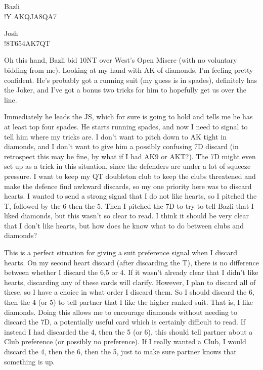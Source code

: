 \documentclass[a4paper]{report}
\theoremstyle{question}
\theoremstyle{theorem}
\theoremstyle{definition}
\newcommand{\<}{\left\langle}%
\renewcommand{\>}{\right\rangle}%
\begin{document}
\begin{center}
Bazli\\
\hand*!{Y AKQJ}{A8}{Q}{A7}
    
Josh\\
\hand*!{8}{T654}{AK7}{QT}
\end{center}

Oh this hand, Bazli bid 10NT over West's Open Misere (with no voluntary bidding from me). Looking at my hand with AK of diamonds, I'm feeling pretty confident. He's probably got a running suit (my guess is in spades), definitely has the Joker, and I've got a bonus two tricks for him to hopefully get us over the line.

Immediately he leads the JS, which for sure is going to hold and tells me he has at least top four spades. He starts running spades, and now I need to signal to tell him where my tricks are. I don't want to pitch down to AK tight in diamonds, and I don't want to give him a possibly confusing 7D discard (in retrospect this may be fine, by what if I had AK9 or AKT?). The 7D might even set up as a trick in this situation, since the defenders are under a lot of squeeze pressure. I want to keep my QT doubleton club to keep the clubs threatened and make the defence find awkward discards, so my one priority here was to discard hearts. I wanted to send a strong signal that I do not like hearts, so I pitched the T, followed by the 6 then the 5. Then I pitched the 7D to try to tell Bazli that I liked diamonds, but this wasn't so clear to read. I think it should be very clear that I don't like hearts, but how does he know what to do between clubs and diamonds?

This is a perfect situation for giving a suit preference signal when I discard hearts. On my second heart discard (after discarding the T), there is no difference between whether I discard the 6,5 or 4. If it wasn't already clear that I didn't like hearts, discarding any of these cards will clarify. However, I plan to discard all of these, so I have a choice in what order I discard them. So I should discard the 6, then the 4 (or 5) to tell partner that I like the higher ranked suit. That is, I like diamonds. Doing this allows me to encourage diamonds without needing to discard the 7D, a potentially useful card which is certainly difficult to read. If instead I had discarded the 4, then the 5 (or 6), this should tell partner about a Club preference (or possibly no preference). If I really wanted a Club, I would discard the 4, then the 6, then the 5, just to make sure partner knows that something is up.
\end{document}
